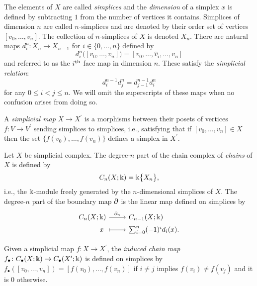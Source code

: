 The elements of $X$ are called \textit{simplices} and the \textit{dimension} of a simplex $x$ is defined by subtracting $1$ from the number of vertices it contains.
Simplices of dimension $n$ are called $n$-simplices and are denoted by their order set of vertices $[v_0, \dots, v_n]$.
The collection of $n$-simplices of $X$ is denoted $X_n$.
There are natural maps $d_i^n \colon X_n \to X_{n-1}$ for $i \in \{0, \dots, n\}$ defined by
\begin{equation*}
d_i^n \big( [v_0, \dots, v_n] \big) =
[v_0, \dots, \widehat{v}_i, \dots, v_n]
\end{equation*}
and referred to as the $i^{\mathrm{th}}$ face map in dimension $n$.
These satisfy the \textit{simplicial relation}:
\begin{equation} \label{e:simplicial relation}
d_i^{n-1} d^n_j = d_{j-1}^{n-1} d_i^n
\end{equation}
for any $0 \leq i < j \leq n$.
We will omit the superscripts of these maps when no confusion arises from doing so.

A \textit{simplicial map} $X \to X^\prime$ is a morphisms between their posets of vertices $f \colon V \to V^\prime$ sending simplices to simplices, i.e., satisfying that if $[v_0, \dots, v_n] \in X$ then the set $\{f(v_0), \dots, f(v_n)\}$ defines a simplex in $X^\prime$.

Let $X$ be simplicial complex.
The degree-$n$ part of the chain complex of \textit{chains} of $X$ is defined by
\begin{equation*}
C_n(X; \Bbbk) = \Bbbk \big\{ X_n \big\},
\end{equation*}
i.e., the $\Bbbk$-module freely generated by the $n$-dimensional simplices of $X$.
The \mbox{degree-$n$} part of the boundary map $\operatorname{\partial}$ is the linear map defined on simplices by
\begin{equation*}
\begin{tikzcd}[column sep=normal, row sep=tiny,row sep = 0ex
,/tikz/column 1/.append style={anchor=base east}
,/tikz/column 2/.append style={anchor=base west}
]
C_n(X; \k) \arrow[r, "\partial_n"] & C_{n-1}(X; \k) \\
x\ \arrow[r, |->] & \sum_{i=0}^{n} (-1)^i d_i (x).
\end{tikzcd}
\end{equation*}

Given a simplicial map $f \colon X \to X^\prime$, the \textit{induced chain map} $f_\bullet \colon C_\bullet(X; \Bbbk) \to C_\bullet(X^\prime; \Bbbk)$ is defined on simplices by $f_\bullet([v_0, \dots, v_n]) = [f(v_0), \dots, f(v_n)]$ if $i \neq j$ implies $ f(v_i) \neq f(v_j)$ and it is $0$ otherwise.


